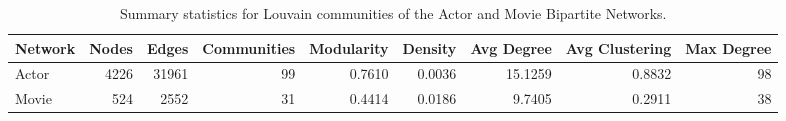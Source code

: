 \begin{table}[h]\centering
\caption{Summary statistics for Louvain communities of the Actor and Movie Bipartite Networks.}
\label{tab:community_summary_stats}
\begin{tabular}{lrrrrrrrr}
\toprule
Network & Nodes & Edges & Communities & Modularity & Density & Avg Degree & Avg Clustering & Max Degree \\
\midrule
Actor & 4226 & 31961 & 99 & 0.7610 & 0.0036 & 15.1259 & 0.8832 & 98 \\
Movie & 524 & 2552 & 31 & 0.4414 & 0.0186 & 9.7405 & 0.2911 & 38 \\
\bottomrule
\end{tabular}

\end{table}